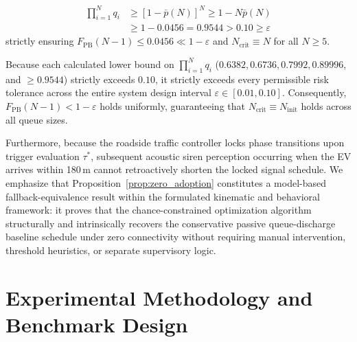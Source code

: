 \documentclass[journal,10pt,twocolumn]{IEEEtran}
\begin{document}
\begin{IEEEproof}
\begin{itemize}
    \begin{equation}
    \begin{aligned}
    \prod_{i=1}^N q_i &\ge [1 - \bar{p}(N)]^N \ge 1 - N \bar{p}(N) \\[3pt]
    &\ge 1 - 0.0456 = 0.9544 > 0.10 \ge \varepsilon
    \end{aligned}
    \end{equation}
    strictly ensuring $F_{\text{PB}}(N - 1) \le 0.0456 \ll 1 - \varepsilon$ and $N_{\text{crit}} \equiv N$ for all $N \ge 5$.
\end{itemize}
Because each calculated lower bound on $\prod_{i=1}^N q_i$ ($0.6382, 0.6736, 0.7992, 0.89996$, and $\ge 0.9544$) strictly exceeds $0.10$, it strictly exceeds every permissible risk tolerance across the entire system design interval $\varepsilon \in [0.01, 0.10]$. Consequently, $F_{\text{PB}}(N - 1) < 1 - \varepsilon$ holds uniformly, guaranteeing that $N_{\text{crit}} \equiv N_{\text{init}}$ holds across all queue sizes. 

Furthermore, because the roadside traffic controller locks phase transitions upon trigger evaluation $\tau^*$, subsequent acoustic siren perception occurring when the EV arrives within 180\,m cannot retroactively shorten the locked signal schedule. We emphasize that Proposition~\ref{prop:zero_adoption} constitutes a model-based fallback-equivalence result within the formulated kinematic and behavioral framework: it proves that the chance-constrained optimization algorithm structurally and intrinsically recovers the conservative passive queue-discharge baseline schedule under zero connectivity without requiring manual intervention, threshold heuristics, or separate supervisory logic.
\end{IEEEproof}

\section{Experimental Methodology and Benchmark Design}
\end{document}
